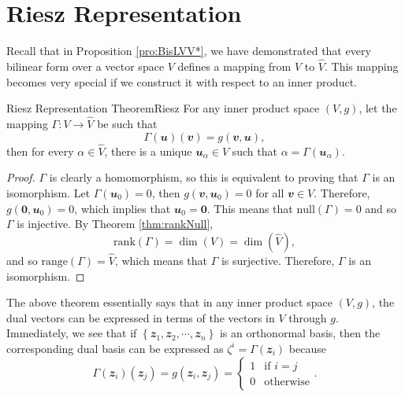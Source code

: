 \documentclass[math, code]{amznotes}
\theoremstyle{remark}
\newcommand{\zero}{\mathbf{0}}
\begin{document}
    \section{Riesz Representation}
    Recall that in Proposition \ref{pro:BisLVV*}, we have demonstrated that every bilinear form over a vector space $V$ defines a mapping from $V$ to $\widehat{V}$. This mapping becomes very special if we construct it with respect to an inner product.
    \begin{thmbox}{Riesz Representation Theorem}{Riesz}
        For any inner product space $(V, g)$, let the mapping $\Gamma \colon V \to \widehat{V}$ be such that
        \begin{equation*}
            \Gamma(\mathbfit{u})(\mathbfit{v}) = g(\mathbfit{v}, \mathbfit{u}),
        \end{equation*}
        then for every $\alpha \in \widehat{V}$, there is a unique $\mathbfit{u}_{\alpha} \in V$ such that $\alpha = \Gamma\left(\mathbfit{u}_{\alpha}\right)$.
        \tcblower
        \begin{proof}
            $\Gamma$ is clearly a homomorphism, so this is equivalent to proving that $\Gamma$ is an isomorphism. Let $\Gamma(\mathbfit{u}_0) = 0$, then $g(\mathbfit{v}, \mathbfit{u}_0) = 0$ for all $\mathbfit{v} \in V$. Therefore, $g(\zero, \mathbfit{u}_0) = 0$, which implies that $\mathbfit{u}_0 = \zero$. This means that $\mathrm{null}(\Gamma) = 0$ and so $\Gamma$ is injective. By Theorem \ref{thm:rankNull}, 
            \begin{equation*}
                \mathrm{rank}(\Gamma) = \dim(V) = \dim\left(\widehat{V}\right),
            \end{equation*}
            and so $\mathrm{range}(\Gamma) = \widehat{V}$, which means that $\Gamma$ is surjective. Therefore, $\Gamma$ is an isomorphism.
        \end{proof}
    \end{thmbox}
    The above theorem essentially says that in any inner product space $(V, g)$, the dual vectors can be expressed in terms of the vectors in $V$ through $g$. Immediately, we see that if $\left\{\mathbfit{z}_1, \mathbfit{z}_2, \cdots, \mathbfit{z}_n\right\}$ is an orthonormal basis, then the corresponding dual basis can be expressed as $\zeta^i = \Gamma\left(\mathbfit{z}_i\right)$ because 
    \begin{equation*}
        \Gamma\left(\mathbfit{z}_i\right)\left(\mathbfit{z}_j\right) = g\left(\mathbfit{z}_i, \mathbfit{z}_j\right) = \begin{cases}
            1 & \textrm{if } i = j \\
            0 & \textrm{otherwise}
        \end{cases}.
    \end{equation*}
\end{document}
